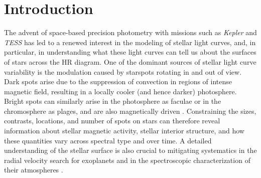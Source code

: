 \documentclass[modern]{aastex62}
\begin{document}
\section{Introduction}
\label{sec:intro}

The advent of space-based precision photometry with missions such as
\emph{Kepler} \citep{Borucki2010} and \emph{TESS} \citep{Ricker2015}
has led to a renewed interest in the modeling of stellar light curves,
and, in particular, in understanding what these light curves can tell
us about the surfaces of stars across the HR diagram. One of the dominant
sources of stellar light curve variability is the modulation caused
by starspots rotating in and out of view.
Dark spots arise due to the suppression of convection in regions of
intense magnetic field, resulting in a locally cooler (and hence darker)
photosphere. Bright spots can similarly
arise in the photosphere as faculae or in the chromosphere as plages, and
are also magnetically driven \citep[e.g.,][]{Berdyugina2005}.
%
Constraining the sizes,
contrasts, locations, and number of spots on stars can therefore reveal
information about stellar magnetic activity, stellar interior structure,
and how these quantities vary across spectral type and over time.
A detailed understanding of the stellar surface is also crucial to
mitigating systematics in the radial velocity search for exoplanets
\citep[e.g.,][]{Lanza2011} and in the spectroscopic characterization of their
atmospheres \citep[e.g.,][]{Rackham2018}.
\end{document}
